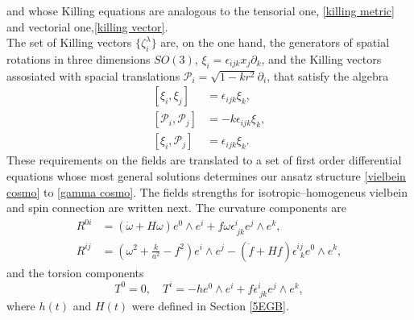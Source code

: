 \documentclass[aps,prd,12pt,superscriptaddress,showpacs,showkeys,longbibliography,reprint]{revtex4-1}
\begin{document}
and whose Killing equations are analogous to the tensorial one, \eqref{killing metric} and vectorial one,\eqref{killing vector}.\\
The set of Killing vectors $\{\zeta^\lambda_i\}$ are, on the one hand, the generators of spatial rotations in three dimensions $SO(3)$, $\xi_i=\epsilon_{ijk}x_j\partial_k$, and the Killing vectors assosiated with spacial translations $\mathcal{P}_i=\sqrt{1-kr^2}\partial_i$, that satisfy the algebra
\begin{align}
  \left[\xi_i,\xi_j\right]&=\epsilon_{ijk}\xi_k,\\
  \left[\mathcal{P}_i,\mathcal{P}_j\right]&=-k\epsilon_{ijk}\xi_k,\\
  \left[\xi_i,\mathcal{P}_j\right]&=\epsilon_{ijk}\xi_k.
\end{align}
These requirements on the fields are translated to a set of first order differential equations whose most general solutions determines our ansatz structure \eqref{vielbein cosmo} to \eqref{gamma cosmo}. The fields strengths for isotropic--homogeneus vielbein and spin connection are written next. The curvature components are
\begin{align}
  R^{0i}&=\left(\dot{\omega}+H\omega\right)e^0\wedge e^i+f\omega\epsilon^i_{\ jk}e^j\wedge e^k,\\
  R^{ij}&=\left(\omega^2+\frac{k}{a^2}-f^2\right)e^i\wedge e^j
  -\left(\dot{f}+Hf\right)\epsilon^{ij}_{\ \ k}e^0\wedge e^k,
\end{align}
and the torsion components
\begin{equation}\label{homotorsion}
  T^0=0,\quad T^i=-he^0\wedge e^i+f\epsilon^i_{\ jk}e^j\wedge e^k,
\end{equation}
where $h(t)$ and $H(t)$ were defined in Section \ref{5EGB}.

\end{document}
